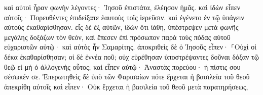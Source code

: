 \documentclass{openreader}
\begin{document}
καὶ αὐτοὶ ἦραν φωνὴν λέγοντες· Ἰησοῦ ἐπιστάτα, ἐλέησον ἡμᾶς. 
καὶ ἰδὼν εἶπεν αὐτοῖς· Πορευθέντες ἐπιδείξατε ἑαυτοὺς τοῖς ἱερεῦσιν. καὶ ἐγένετο ἐν τῷ ὑπάγειν αὐτοὺς ἐκαθαρίσθησαν. 
εἷς δὲ ἐξ αὐτῶν, ἰδὼν ὅτι ἰάθη, ὑπέστρεψεν μετὰ φωνῆς μεγάλης δοξάζων τὸν θεόν, 
καὶ ἔπεσεν ἐπὶ πρόσωπον παρὰ τοὺς πόδας αὐτοῦ εὐχαριστῶν αὐτῷ· καὶ αὐτὸς ἦν Σαμαρίτης. 
ἀποκριθεὶς δὲ ὁ Ἰησοῦς εἶπεν· ⸀Οὐχὶ οἱ δέκα ἐκαθαρίσθησαν; οἱ δὲ ἐννέα ποῦ; 
οὐχ εὑρέθησαν ὑποστρέψαντες δοῦναι δόξαν τῷ θεῷ εἰ μὴ ὁ ἀλλογενὴς οὗτος; 
καὶ εἶπεν αὐτῷ· Ἀναστὰς πορεύου· ἡ πίστις σου σέσωκέν σε. 
Ἐπερωτηθεὶς δὲ ὑπὸ τῶν Φαρισαίων πότε ἔρχεται ἡ βασιλεία τοῦ θεοῦ ἀπεκρίθη αὐτοῖς καὶ εἶπεν· Οὐκ ἔρχεται ἡ βασιλεία τοῦ θεοῦ μετὰ παρατηρήσεως, 
\end{document}
